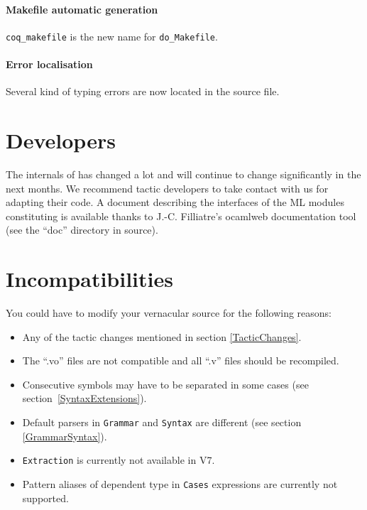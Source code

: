 \documentclass[11pt]{article}
\begin{document}
\paragraph{Makefile automatic generation} {\tt coq\_makefile} is the
new name for {\tt do\_Makefile}.

\paragraph{Error localisation} Several kind of typing errors are now
located in the source file.

\section{Developers}
\label{Developers}
The internals of {\Coq} has changed a lot and will continue to change
significantly in the next months. We recommend tactic developers to
take contact with us for adapting their code. A document describing
the interfaces of the ML modules constituting {\Coq} is available
thanks to J.-C. Filliatre's ocamlweb
documentation tool (see the ``doc'' directory in {\Coq} source).

\section{Incompatibilities}
\label{Incompatibilities}

  You could have to modify your vernacular source for the following
  reasons:

  \begin{itemize}
 
  \item Any of the tactic changes mentioned in section \ref{TacticChanges}.

  \item The ``.vo'' files are not compatible and all ``.v'' files should
  be recompiled.

  \item Consecutive symbols may have to be separated in some cases (see
  section~\ref{SyntaxExtensions}).

  \item Default parsers in {\tt Grammar} and {\tt Syntax} are
  different (see section \ref{GrammarSyntax}).

  \item {\tt Extraction} is currently not available in {\Coq} V7.

  \item Pattern aliases of dependent type in \verb=Cases=
  expressions are currently not supported.

  \end{itemize}
\end{document}
